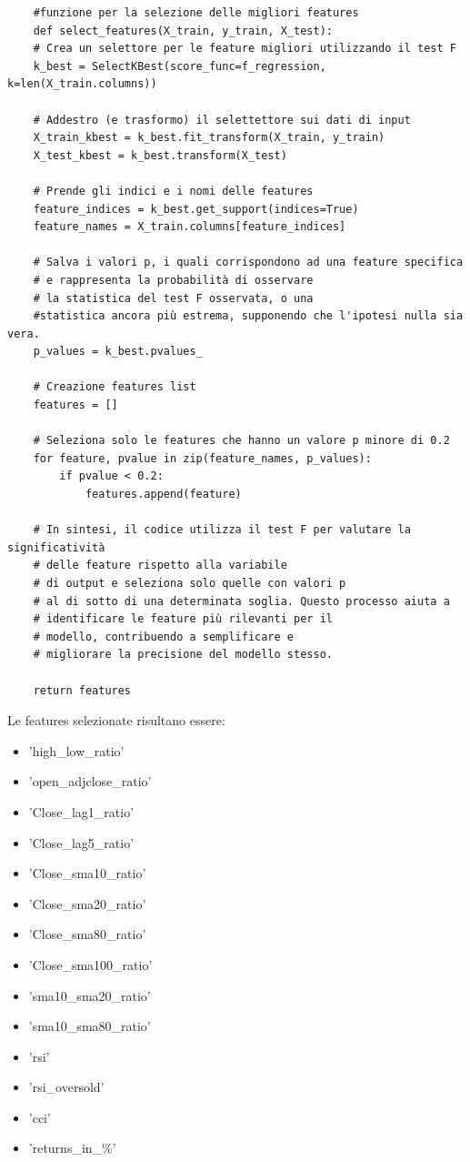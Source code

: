 \documentclass{article}
\begin{document}
\begin{verbatim} 
    #funzione per la selezione delle migliori features
    def select_features(X_train, y_train, X_test):
    # Crea un selettore per le feature migliori utilizzando il test F
    k_best = SelectKBest(score_func=f_regression, k=len(X_train.columns))

    # Addestro (e trasformo) il selettettore sui dati di input
    X_train_kbest = k_best.fit_transform(X_train, y_train)
    X_test_kbest = k_best.transform(X_test)

    # Prende gli indici e i nomi delle features
    feature_indices = k_best.get_support(indices=True)
    feature_names = X_train.columns[feature_indices]

    # Salva i valori p, i quali corrispondono ad una feature specifica 
    # e rappresenta la probabilità di osservare
    # la statistica del test F osservata, o una
    #statistica ancora più estrema, supponendo che l'ipotesi nulla sia vera.
    p_values = k_best.pvalues_

    # Creazione features list
    features = []

    # Seleziona solo le features che hanno un valore p minore di 0.2
    for feature, pvalue in zip(feature_names, p_values):
        if pvalue < 0.2:
            features.append(feature)

    # In sintesi, il codice utilizza il test F per valutare la significatività
    # delle feature rispetto alla variabile
    # di output e seleziona solo quelle con valori p
    # al di sotto di una determinata soglia. Questo processo aiuta a
    # identificare le feature più rilevanti per il
    # modello, contribuendo a semplificare e 
    # migliorare la precisione del modello stesso.

    return features
\end{verbatim}
Le features selezionate risultano essere:
\begin{multicols}{2}
    \begin{itemize}
        \item 'high\_low\_ratio'
        \item 'open\_adjclose\_ratio'
        \item 'Close\_lag1\_ratio'
        \item 'Close\_lag5\_ratio'
        \item 'Close\_sma10\_ratio'
        \item 'Close\_sma20\_ratio'
        \item 'Close\_sma80\_ratio'
    \end{itemize}
    \columnbreak
    \begin{itemize}
    \item 'Close\_sma100\_ratio'
    \item 'sma10\_sma20\_ratio'
    \item 'sma10\_sma80\_ratio'
    \item 'rsi'
    \item 'rsi\_oversold'
    \item 'cci'
    \item 'returns\_in\_\%'
\end{itemize}

\end{multicols}
\end{document}
